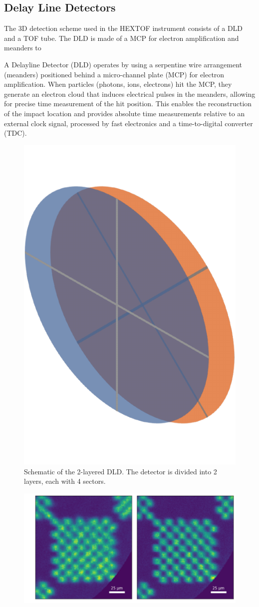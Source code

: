 \subsection{Delay Line Detectors}
The 3D detection scheme used in the \gls{HEXTOF} instrument consists of a \gls{DLD} and a \gls{TOF} tube. The \gls{DLD} is made of a \gls{MCP} for electron amplification and meanders to 

A Delayline Detector (DLD) operates by using a serpentine wire arrangement (meanders) positioned behind a micro-channel plate (MCP) for electron amplification. When particles (photons, ions, electrons) hit the MCP, they generate an electron cloud that induces electrical pulses in the meanders, allowing for precise time measurement of the hit position. This enables the reconstruction of the impact location and provides absolute time measurements relative to an external clock signal, processed by fast electronics and a time-to-digital converter (TDC).

\begin{figure}
    \centering
    \includegraphics[width=0.3\linewidth]{images/sectors_figure.pdf}
    \caption{Schematic of the 2-layered DLD. The detector is divided into 2 layers, each with 4 sectors.}
    \label{fig:sectors}
\end{figure}

\begin{figure}
    \includegraphics[width=1\linewidth]{images/chessy_deblurring_merged_events.png}
\end{figure}


